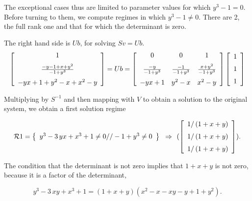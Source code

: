 The exceptional cases thus are limited to parameter values for which ${y}^{3} - 1 = 0$.
Before turning to them, we compute regimes in which ${y}^{3} - 1 \neq 0$.
There are 2, the full rank one and that for which the determinant is zero.

The right hand side is $Ub$, for solving $Sv = Ub$.
\[
\left [\begin {array}{c} 1\\\noalign{\medskip}
{\frac {-y-1+x+y^2}{-1+{y}^{3}}}\\\noalign{\medskip}
-yx+1+{y}^{2}-x+{x}^{2}-y\end {array}\right ]
= Ub =
\left [\begin {array}{ccc} 
0&0&1\\\noalign{\medskip}
{\frac {-y}{-1+{y}^{3}}}&{\frac {-1}{-1+{y}^{3}}}&{\frac {x+{y}^{2}}{-1+{y}^{3}}}\\\noalign{\medskip}
-yx+1&{y}^{2}-x&{x}^{2}-y\end {array}\right ]
\left [\begin {array}{c} 1\\\noalign{\medskip}1\\\noalign{\medskip}1
\end {array}\right ]
\]

Multiplying by $S^{-1}$ and then mapping with $V$ to obtain a solution to the
original system,  we obtain a first solution regime


\[\RR1 =  
\breg {y}^{3}-3\,yx+{x}^{3}+1\neq 0//-1+{y}^{3}\neq 0\ereg \implies
(
\left [\begin {array}{c}1/ \left (1+x+y\right )\\\noalign{\medskip}
1/ \left (1+x+y\right )\\\noalign{\medskip}
1/ \left (1+x+y\right )
\end {array}\right ]
).
\]

The condition that the determinant is not zero implies that 
$1 + x + y$ is not zero, because it is a factor of the determinant,

\[
{y}^{3}-3\,xy+{x}^{3}+1 = 
(1 + x + y) (x^2  - x - x y - y + 1 + y^2 ).
\]

